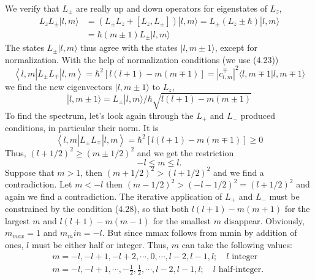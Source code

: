 We verify that $L_{\pm}$ are really up and down operators for eigenstates of $L_z$,
\begin{equation}
\begin{aligned} L_{z} L_{\pm}|l, m\rangle &=\left(L_{\pm} L_{z}+\left[L_{z}, L_{\pm}\right]\right)|l, m\rangle= L_{\pm}\left(L_{z} \pm \hbar\right)|l, m\rangle \\ &=\hbar(m \pm 1) L_{\pm}|l, m\rangle \end{aligned}
\end{equation}
The states $L_{\pm} | l,m\rangle$ thus agree with the states $| l, m \pm 1\rangle$, except for normalization. With the help of normalization conditions (we use (4.23))
$$\left\langle l, m\left|L_{\pm} L_{\mp}\right| l, m\right\rangle=\hbar^{2}[l(l+1)-m(m \mp 1)]=\left|c_{l, m}^{\mp}\right|^{2}\langle l, m \mp 1 | l, m \mp 1\rangle$$
we find the new eigenvectors $| l, m \pm 1\rangle$ to $L_z$,
\begin{equation}
    |l, m \pm 1\rangle= L_{\pm}|l, m\rangle / \hbar \sqrt{l(l+1)-m(m \pm 1)}
    \end{equation}
To find the spectrum, let's look again through the $L_+$ and $L_-$ produced conditions, in particular their norm. It is
\begin{equation}
    \left\langle l, m\left|L_{\pm} L_{\mp}\right| l, m\right\rangle=\hbar^{2}[l(l+1)-m(m \mp 1)] \geq 0
    \end{equation}
Thus, $(l + 1/2)^2 \geq (m \pm 1/2)^2$ and we get the restriction
\begin{equation}
    -l\leq m \leq l.
\end{equation}
Suppose that $m> 1$, then $(m + 1/2)^2> (l + 1/2)^2$ and we find a contradiction. Let $m <-l$ then $(m - 1/2)^2> (-l - 1/2)^2 = (l + 1/2)^2$ and again we find a contradiction. The iterative application of $L_+$ and $L_-$ must be constrained by the condition (4.28), so that both $l (l + 1) - m (m + 1)$ for the largest $m$ and $l (l + 1 ) - m (m - 1)$ for the smallest $m$ disappear. Obviously, $m_{max} = 1$ and $m_min = -l$. But since mmax follows from mmin by addition of ones, $l$ must be either half or integer. Thus, $m$ can take the following values:
\begin{equation}
\begin{array}{l}{m=-l,-l+1,-l+2, \cdots, 0, \cdots, l-2, l-1, l ; \quad l \text { integer }} \\ {m=-l,-l+1, \cdots,-\frac{1}{2}, \frac{1}{2}, \cdots, l-2, l-1, l ; \quad l \text { half-integer. }}\end{array}
\end{equation}

